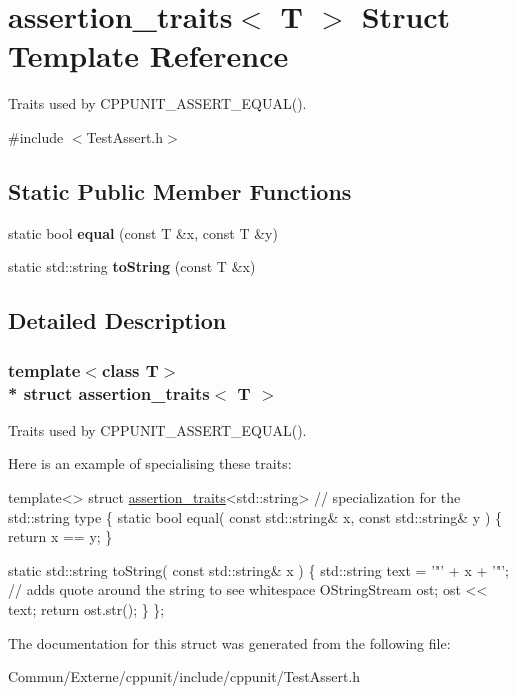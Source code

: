 \hypertarget{structassertion__traits}{}\section{assertion\+\_\+traits$<$ T $>$ Struct Template Reference}
\label{structassertion__traits}


Traits used by C\+P\+P\+U\+N\+I\+T\+\_\+\+A\+S\+S\+E\+R\+T\+\_\+\+E\+Q\+U\+A\+L().  




{\ttfamily \#include $<$Test\+Assert.\+h$>$}

\subsection*{Static Public Member Functions}
\begin{DoxyCompactItemize}
\item 
static bool {\bfseries equal} (const T \&x, const T \&y)\hypertarget{structassertion__traits_a287c07a4e171256a0128201c7e4c4228}{}\label{structassertion__traits_a287c07a4e171256a0128201c7e4c4228}

\item 
static std\+::string {\bfseries to\+String} (const T \&x)\hypertarget{structassertion__traits_a1c96296fb44902b4f22d99b9c3cc7749}{}\label{structassertion__traits_a1c96296fb44902b4f22d99b9c3cc7749}

\end{DoxyCompactItemize}


\subsection{Detailed Description}
\subsubsection*{template$<$class T$>$\\*
struct assertion\+\_\+traits$<$ T $>$}

Traits used by C\+P\+P\+U\+N\+I\+T\+\_\+\+A\+S\+S\+E\+R\+T\+\_\+\+E\+Q\+U\+A\+L(). 

Here is an example of specialising these traits\+:


\begin{DoxyCode}
\textcolor{keyword}{template}<>
\textcolor{keyword}{struct }\hyperlink{structassertion__traits}{assertion\_traits}<std::string>   \textcolor{comment}{// specialization for the std::string type}
\{
  \textcolor{keyword}{static} \textcolor{keywordtype}{bool} equal( \textcolor{keyword}{const} std::string& x, \textcolor{keyword}{const} std::string& y )
  \{
    \textcolor{keywordflow}{return} x == y;
  \}

  \textcolor{keyword}{static} std::string toString( \textcolor{keyword}{const} std::string& x )
  \{
    std::string text = \textcolor{charliteral}{'"'} + x + \textcolor{charliteral}{'"'};    \textcolor{comment}{// adds quote around the string to see whitespace}
    OStringStream ost;
    ost << text;
    \textcolor{keywordflow}{return} ost.str();
  \}
\};
\end{DoxyCode}
 

The documentation for this struct was generated from the following file\+:\begin{DoxyCompactItemize}
\item 
Commun/\+Externe/cppunit/include/cppunit/Test\+Assert.\+h\end{DoxyCompactItemize}

